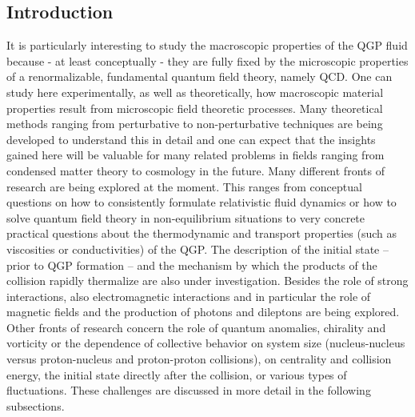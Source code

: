 \subsection{Introduction}

It is particularly interesting to study the macroscopic properties of 
  the QGP fluid because - at least conceptually - they are fully fixed 
  by the microscopic properties of a renormalizable, fundamental quantum 
  field theory, namely QCD. 
One can study here experimentally, as well as theoretically, how 
  macroscopic material properties result from microscopic field 
  theoretic processes. 
Many theoretical methods ranging from perturbative to non-perturbative 
  techniques are being developed to understand this in detail and one can 
  expect that the insights gained here will be valuable for many related 
  problems in fields ranging from condensed matter theory to cosmology in 
  the future.  
Many different fronts of research are being explored at the moment. 
This ranges from conceptual questions on how to consistently formulate 
  relativistic fluid dynamics or how to solve quantum field theory in 
  non-equilibrium situations to very concrete practical questions about 
  the thermodynamic and transport properties (such as viscosities or 
  conductivities) of the QGP. 
The description of the initial state -- prior to QGP formation --
  and the mechanism by which the products of the collision rapidly thermalize
  are also under investigation.
Besides the role of strong interactions, also electromagnetic interactions 
  and in particular the role of magnetic fields and the production of 
  photons and dileptons are being explored. 
Other fronts of research concern the role of quantum anomalies, chirality 
  and vorticity or the dependence of collective behavior on system size 
  (nucleus-nucleus versus proton-nucleus and proton-proton collisions), 
  on centrality and collision energy, the initial state directly after 
  the collision, or various types of fluctuations. 
These challenges are discussed in more detail in the following subsections.



